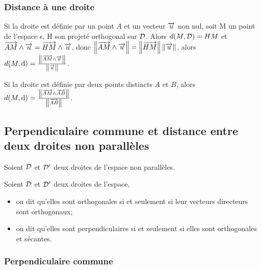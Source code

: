 \subsubsection{Distance à une droite}

Si la droite est définie par un point \(A\) et un vecteur \(\overrightarrow{u}\) non nul, soit M un point de l'espace \(\epsilon\), H son projeté orthogonal sur \(\mathcal{D}\). Alors \(d(M,\mathcal{D})=HM\) et \(\overrightarrow{AM}\wedge\overrightarrow{u}=\overrightarrow{HM}\wedge\overrightarrow{u}\), donc \(\left\lVert\overrightarrow{AM}\wedge\overrightarrow{u}\right\rVert=\left\lVert\overrightarrow{HM}\right\rVert\left\lVert\overrightarrow{u}\right\rVert\), alors \(d(M,\mathrm{d})=\frac{\left\lVert\overrightarrow{AM}\wedge\overrightarrow{u}\right\rVert}{\left\lVert\overrightarrow{u}\right\rVert}\).

Si la droite est définie par deux points distincts \(A\) et \(B\), alors \(d(M,\mathrm{d})=\frac{\left\lVert\overrightarrow{AM}\wedge\overrightarrow{AB}\right\rVert}{\left\lVert\overrightarrow{AB}\right\rVert}\).

\subsection{Perpendiculaire commune et distance entre deux droites non parallèles}

Soient \(\mathcal{D}\) et \(\mathcal{D}'\) deux droites de l'espace non parallèles.
\begin{defdef}
  Soient \(\mathcal{D}\) et \(\mathcal{D}'\) deux droites de l'espace,
  \begin{itemize}
  \item on dit qu'elles sont orthogonales si et seulement si leur vecteurs directeurs sont orthogonaux;
  \item on dit qu'elles sont perpendiculaires si et seulement si elles sont orthogonales et sécantes.
  \end{itemize}
\end{defdef}

\subsubsection{Perpendiculaire commune}

